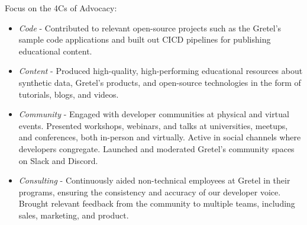 \documentclass[10pt]{article} %
\begin{document}
\begin{minipage}[t]{0.5\textwidth}
{    Focus on the 4Cs of Advocacy: 

    \begin{itemize}
        \item \textit{Code} - Contributed to relevant open-source projects such as the Gretel's sample code applications and built out CICD pipelines for publishing educational content.
    
        \item \textit{Content} - Produced high-quality, high-performing educational resources about synthetic data, Gretel's products, and open-source technologies in the form of tutorials, blogs, and videos.
    
        \item \textit{Community} - Engaged with developer communities at physical and virtual events. Presented workshops, webinars, and talks at universities, meetups, and conferences, both in-person and virtually. Active in social channels where developers congregate. Launched and moderated Gretel's community spaces on Slack and Discord.
        
        \item \textit{Consulting} - Continuously aided non-technical employees at Gretel in their programs, ensuring the consistency and accuracy of our developer voice. Brought relevant feedback from the community to multiple teams, including sales, marketing, and product.
    \end{itemize}
}



\end{minipage} %
\hfill
\end{document}
